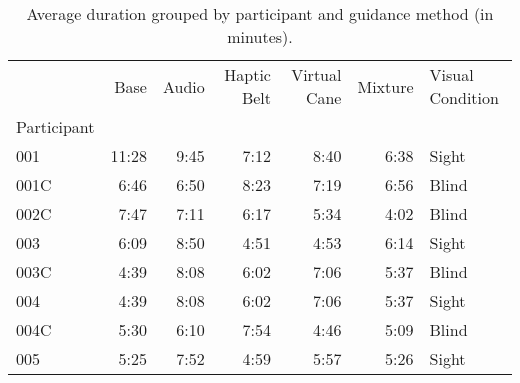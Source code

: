 
\begin{table}[!htb]
\centering
\caption{Average duration grouped by participant and guidance method (in minutes).}
\label{tab:duracao_average_scene}
\begin{tabular}{lrrrrrl}
\toprule
{} &   Base & Audio & Haptic Belt & Virtual Cane & Mixture & Visual Condition \\
Participant &        &       &             &              &         &                  \\
\midrule
001         &  11:28 &  9:45 &        7:12 &         8:40 &    6:38 &            Sight \\
001C        &   6:46 &  6:50 &        8:23 &         7:19 &    6:56 &            Blind \\
002C        &   7:47 &  7:11 &        6:17 &         5:34 &    4:02 &            Blind \\
003         &   6:09 &  8:50 &        4:51 &         4:53 &    6:14 &            Sight \\
003C        &   4:39 &  8:08 &        6:02 &         7:06 &    5:37 &            Blind \\
004         &   4:39 &  8:08 &        6:02 &         7:06 &    5:37 &            Sight \\
004C        &   5:30 &  6:10 &        7:54 &         4:46 &    5:09 &            Blind \\
005         &   5:25 &  7:52 &        4:59 &         5:57 &    5:26 &            Sight \\
\bottomrule
\end{tabular}
\end{table}

